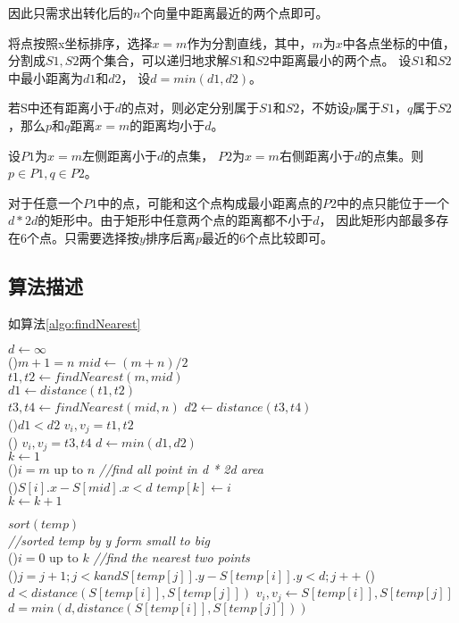 因此只需求出转化后的$n$个向量中距离最近的两个点即可。

将点按照x坐标排序，选择$x=m$作为分割直线，其中，$m$为$x$中各点坐标的中值，分割成$S1,S2$两个集合，可以递归地求解$S1$和$S2$中距离最小的两个点。
设$S1$和$S2$中最小距离为$d1$和$d2$， 设$d=min(d1,d2)$。

若S中还有距离小于$d$的点对，则必定分别属于$S1$和$S2$，不妨设$p$属于$S1$，$q$属于$S2$，那么$p$和$q$距离$x=m$的距离均小于$d$。

设$P1$为$x=m$左侧距离小于$d$的点集， $P2$为$x=m$右侧距离小于$d$的点集。则 $p \in P1, q \in P2$。

对于任意一个$P1$中的点，可能和这个点构成最小距离点的$P2$中的点只能位于一个 $d * 2d$的矩形中。由于矩形中任意两个点的距离都不小于$d$，
因此矩形内部最多存在6个点。只需要选择按$y$排序后离$p$最近的6个点比较即可。


\subsection*{算法描述}

如算法\ref{algo:findNearest}

\begin{algorithm}[H]
    \caption{$findNearest(S[1..n])$}\label{algo:findNearest}
    $d \leftarrow \infty$\\

    \If(){$m+1=n$}{
    }
    $mid \leftarrow (m+n)/2 $\\
    $t1, t2 \leftarrow findNearest(m,mid)$\\
    $d1 \leftarrow distance(t1,t2)$\\
    $t3, t4 \leftarrow findNearest(mid, n)$
    $d2 \leftarrow distance(t3, t4)$\\
    \If(){$d1 < d2$}{
        $v_i, v_j = t1, t2$\\
    }\Else(){
        $v_i, v_j = t3, t4$
    }
    $d \leftarrow min(d1, d2)$\\
    $k \leftarrow 1$ \\
    \For(){$i = m$ up to $n$}{ \emph{//find all point in d * 2d area} \\
        \If(){$S[i].x-S[mid].x < d$}{
            $temp[k] \leftarrow i$\\
            $k \leftarrow k+1$
        }
    }

    $sort(temp)$ \\
    \emph{//sorted temp by y form small to big} \\

    \For(){$i= 0$ up to $k$}{ \emph{//find the nearest two points}\\
        \For(){$j=j+1; j<k and S[temp[j]].y - S[temp[i]].y < d; j++$}{
            \If(){$d < distance(S[temp[i]], S[temp[j]])$}{
                $v_i, v_j \leftarrow S[temp[i]], S[temp[j]] $
            }
            $d=min(d, distance(S[temp[i]], S[temp[j]]))$
        }
    }

\end{algorithm}


